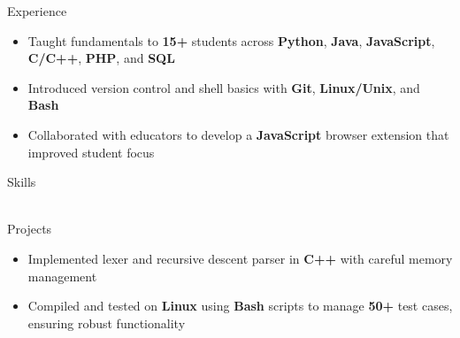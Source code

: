 \documentclass{resume}
\begin{document}
\begin{experienceSection}{Experience}
    \experienceItem[
        company={The Coder School},
        location={Berkeley Heights, NJ},
        position={Code Tutor},
        duration={March 2024 - August 2024}
    ]
    \begin{itemize}[itemsep=-6pt, leftmargin=2em, rightmargin=0.8em, before=\raggedright, after=\normalfont]
        \item Taught fundamentals to \textbf{15+} students across \textbf{Python}, \textbf{Java}, \textbf{JavaScript}, \textbf{C/C++}, \textbf{PHP}, and \textbf{SQL}
        \item Introduced version control and shell basics with \textbf{Git}, \textbf{Linux/Unix}, and \textbf{Bash}
        \item Collaborated with educators to develop a \textbf{JavaScript} browser extension that improved student focus
    \end{itemize}

\end{experienceSection}

\begin{skillsSection}{Skills}
    \skillItem[
        category={Languages},
        skills={Python, C, C++, JavaScript, TypeScript, SQL}
    ] \\
    \skillItem[
        category={Full Stack},
        skills={React, Next.js, Vue, Node.js, MongoDB, Zustand, Tailwind CSS, Slack SDK, Zendesk API}
    ] \\
    \skillItem[
        category={DevOps \& Tooling},
        skills={AWS, Datadog, Kubernetes, Terraform, Argo CD, CircleCI, Git, Bash}
    ]
\end{skillsSection}

\begin{experienceSection}{Projects}
    \projectItem[
        title={Mini C-Like Programming Language},
    ]
    \vspace{-0.5em}
    \begin{itemize}[topsep=0pt, itemsep=-6pt, leftmargin=2em, rightmargin=0.8em, before=\raggedright, after=\normalfont]
        \item Implemented lexer and recursive descent parser in \textbf{C++} with careful memory management
        \item Compiled and tested on \textbf{Linux} using \textbf{Bash} scripts to manage \textbf{50+} test cases, ensuring robust functionality 
    \end{itemize}
\end{experienceSection}
\end{document}

